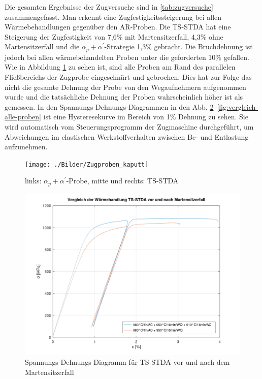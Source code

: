 Die gesamten Ergebnisse der Zugversuche sind in \ref{tab:zugversuche} zusammengefasst. Man erkennt eine Zugfestigkeitssteigerung bei allen Wärmebehandlungen gegenüber den AR-Proben. Die TS-STDA hat eine Steigerung der Zugfestigkeit von 7,6\% mit Martensitzerfall, 4,3\% ohne Martensitzerfall und die $\alpha_p + \alpha^\prime$-Strategie 1,3\%  gebracht. Die Bruchdehnung ist jedoch bei allen wärmebehandelten Proben unter die geforderten 10\% gefallen. 
Wie in Abbildung \ref{fig:zugkaputt} zu sehen ist, sind alle Proben am Rand des parallelen Fließbereichs der Zugprobe eingeschnürt und gebrochen. Dies hat zur Folge das nicht die gesamte Dehnung der Probe von den Wegaufnehmern aufgenommen wurde und die tatsächliche Dehnung der Proben wahrscheinlich höher ist als gemessen. In den Spannungs-Dehnungs-Diagrammen in den Abb. \ref{fig:vergleich-vor-und-nach-zerfall}--\ref{fig:vergleich-alle-proben} ist eine Hysteresekurve im Bereich von 1\% Dehnung zu sehen. Sie wird automatisch vom Steuerungsprogramm der Zugmaschine durchgeführt, um Abweichungen im elastischen Werkstoffverhalten zwischen Be- und Entlastung aufzunehmen. 


\begin{figure}
	\centering
	\texttt{[image: ./Bilder/Zugproben\_kaputt]}
	\caption{links: $\alpha_p + \alpha^\prime$-Probe, mitte und rechts: TS-STDA}
	\label{fig:zugkaputt}
\end{figure}

\begin{figure}
	\centering
	\includegraphics[width=0.7\linewidth]{./Bilder/Vergleich vor und nach Zerfall}
	\caption{Spannungs-Dehnungs-Diagramm für TS-STDA vor und nach dem Martensitzerfall}
	\label{fig:vergleich-vor-und-nach-zerfall}
\end{figure}

